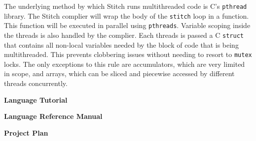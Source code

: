 \documentclass[11pt, oneside]{article}   	%
\begin{document}
The underlying method by which Stitch runs multithreaded code is C's \verb|pthread| library.  The Stitch complier will wrap the body of the \verb|stitch| loop in a function.  This function will be executed in parallel using \verb|pthreads|.  Variable scoping inside the threads is also handled by the complier.  Each threads is passed a C \verb|struct| that contains all non-local variables needed by the block of code that is being multithreaded.  This prevents clobbering issues without needing to resort to \verb|mutex| locks.  The only exceptions to this rule are accumulators, which are very limited in scope, and arrays, which can be sliced and piecewise accessed by different threads concurrently.   

\newpage

\LARGE\textbf{Language Tutorial}\\[2em]
\normalsize

\newpage

\LARGE\textbf{Language Reference Manual}\\[2em]
\normalsize

\newpage

\LARGE\textbf{Project Plan}\\[2em]
\normalsize
\end{document}
